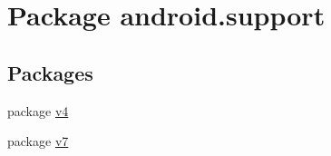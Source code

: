 \hypertarget{namespaceandroid_1_1support}{}\section{Package android.\+support}
\label{namespaceandroid_1_1support}
\subsection*{Packages}
\begin{DoxyCompactItemize}
\item 
package \hyperlink{namespaceandroid_1_1support_1_1v4}{v4}
\item 
package \hyperlink{namespaceandroid_1_1support_1_1v7}{v7}
\end{DoxyCompactItemize}
